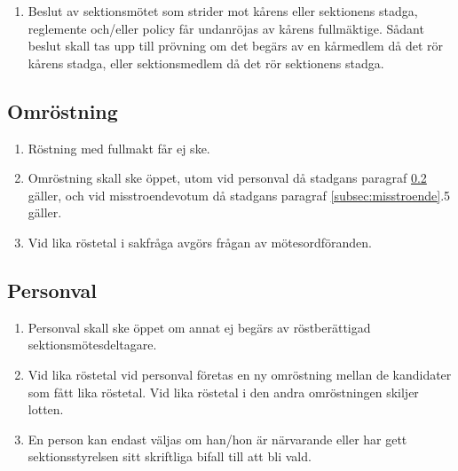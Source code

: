 \documentclass[11pt,a4paper]{article}
\begin{document}
\begin{enumerate}[\thesubsection .1]

  \item Beslut av sektionsmötet som strider mot kårens eller
  sektionens stad\-ga, reglemente och/eller policy får undanröjas av
  kårens fullmäktige. Så\-dant beslut skall tas upp till prövning om det begärs av en kår\-med\-lem då det rör kårens stadga, eller
  sektionsmedlem då det rör sektion\-ens stadga.

\end{enumerate}

\subsection{Omröstning}

\begin{enumerate}[\thesubsection .1]

  \item Röstning med fullmakt får ej ske.

  \item Omröstning skall ske öppet, utom vid personval då stadgans
  paragraf \ref{subsec:personval} gäller, och vid misstroendevotum då stadgans paragraf \ref{subsec:misstroende}.5 gäller.

  \item Vid lika röstetal i sakfråga avgörs frågan av mötesordföranden.

\end{enumerate}

\subsection{Personval}

\label{subsec:personval}

\begin{enumerate}[\thesubsection .1]
  
  \item Personval skall ske öppet om annat ej begärs av röstberättigad sektionsmötesdeltagare.
  
  \item Vid lika röstetal vid personval företas en ny omröstning mellan de kandidater som fått lika röstetal. Vid lika röstetal i den andra omröstningen skiljer lotten.
  
  \item En person kan endast väljas om han/hon är närvarande eller har gett sektionsstyrelsen sitt skriftliga bifall till att bli vald.

\end{enumerate}
\end{document}
